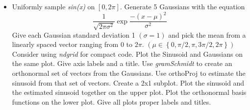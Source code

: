 \documentclass{article}
\begin{document}
\begin{itemize}
\item Uniformly sample \emph{sin(x)} on $[0, 2\pi]$.  Generate 5 Gaussians with the equation
$$
\frac{1}{\sqrt{2\pi \sigma^2}}\exp{\frac{-(x-\mu)^2}{\sigma^2}}
$$
Give each Gaussian standard deviation 1 $(\sigma = 1)$ and pick the mean from a linearly spaced vector ranging from $0$ to $2\pi$. $(\mu \in \left\{0, \pi/2, \pi, 3\pi/2, 2\pi\right\})$ Consider using \emph{ndgrid} for compact code.  Plot the Sinusoid and Gaussians on the same plot.  Give axis labels and a title.  Use \emph{gramSchmidt} to create an orthonormal set of vectors from the Gaussians.  Use orthoProj to estimate the sinusoid from that set of vectors.  Create a 2x1 subplot.  Plot the sinusoid and the estimated sinusoid together on the upper plot.  Plot the orthonormal basis functions on the lower plot.  Give all plots proper labels and titles.
\end{itemize}
\end{document}
